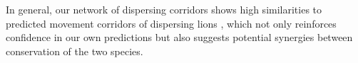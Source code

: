 \documentclass[abstract=on,10pt,a4paper,bibliography=totocnumbered]{scrartcl}
\begin{document}
In general, our network of dispersing corridors shows high similarities to
predicted movement corridors of dispersing lions \citep{Elliot.2014}, which not
only reinforces confidence in our own predictions but also suggests potential
synergies between conservation of the two species.

%
%
\end{document}
